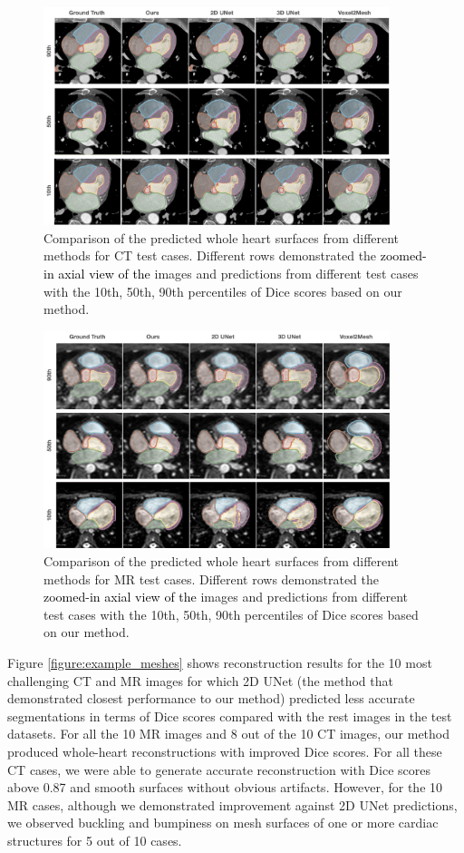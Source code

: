 \documentclass[times,review,preprint,authoryear]{elsarticle}
\begin{document}
\begin{figure}[H]
\centering
\includegraphics[width=0.9\textwidth]{ct_seg_compare2.png}
\caption{Comparison of the predicted whole heart surfaces from different methods for CT test cases. Different rows demonstrated the \textcolor{black}{zoomed-in axial view of the} images and predictions from different test cases with the 10th, 50th, 90th percentiles of Dice scores based on our method.} 
\label{figure:ct_seg_compare}
\end{figure}

\begin{figure}[H]
\centering
\includegraphics[width=0.9\textwidth]{mr_seg_compare2.png}
\caption{Comparison of the predicted whole heart surfaces from different methods for MR test cases. Different rows demonstrated the \textcolor{black}{zoomed-in axial view of the} images and predictions from different test cases with the 10th, 50th, 90th percentiles of Dice scores based on our method.} 
\label{figure:mr_seg_compare}
\end{figure}

Figure \ref{figure:example_meshes} shows reconstruction results for the 10 most challenging CT and MR images for which 2D UNet (the method that demonstrated closest performance to our method) predicted less accurate segmentations in terms of Dice scores compared with the rest images in the test datasets. For all the 10 MR images and 8 out of the 10 CT images, our method produced whole-heart reconstructions with improved Dice scores. For all these CT cases, we were able to generate accurate reconstruction with Dice scores above 0.87 and smooth surfaces without obvious artifacts. However, for the 10 MR cases, although we demonstrated improvement against 2D UNet predictions, we observed buckling and bumpiness on mesh surfaces of one or more cardiac structures for 5 out of 10 cases. 
\end{document}
